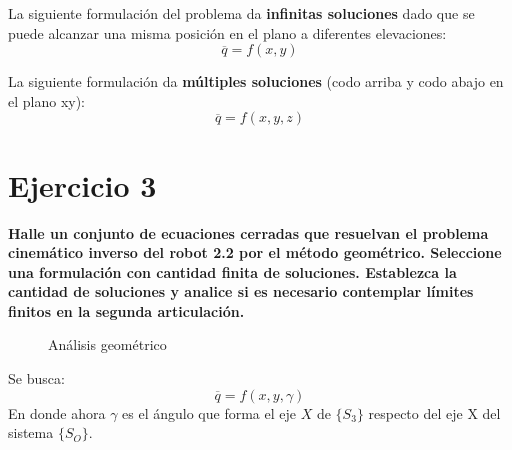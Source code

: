 \documentclass[a4paper,12pt]{article}
\begin{document}
La siguiente formulación del problema da \textbf{infinitas soluciones} dado que se puede alcanzar una misma posición en el plano a diferentes elevaciones:
\begin{equation*}
    \overline{q} = f(x, y)
\end{equation*}

La siguiente formulación da \textbf{múltiples soluciones} (codo arriba y codo abajo en el plano xy):
\begin{equation*}
    \overline{q} = f(x, y, z)
\end{equation*}

\section{Ejercicio 3}
\textbf{Halle un conjunto de ecuaciones cerradas que resuelvan el problema
cinemático inverso del robot 2.2 por el método geométrico. Seleccione una formulación con
cantidad finita de soluciones. Establezca la cantidad de soluciones y analice si es necesario
contemplar límites finitos en la segunda articulación.}

\begin{figure}[H]
    \centering
    \begin{adjustbox}{scale = 0.7, max width=\columnwidth}
    \end{adjustbox}
    \caption{Análisis geométrico}
\end{figure}

Se busca:
\begin{equation*}
    \overline{q} = f(x, y, \gamma)
\end{equation*}
En donde ahora $\gamma$ es el ángulo que forma el eje $X$ de $\{S_3\}$ respecto del eje X del sistema $\{S_O\}$.
\end{document}

